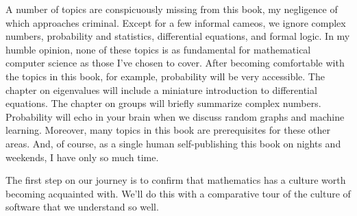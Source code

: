 A number of topics are conspicuously missing from this book, my negligence of
which approaches criminal. Except for a few informal cameos, we ignore complex
numbers, probability and statistics, differential equations, and formal logic.
In my humble opinion, none of these topics is as fundamental for mathematical
computer science as those I've chosen to cover. After becoming comfortable with
the topics in this book, for example, probability will be very accessible. The
chapter on eigenvalues will include a miniature introduction to differential
equations. The chapter on groups will briefly summarize complex numbers.
Probability will echo in your brain when we discuss random graphs and machine
learning. Moreover, many topics in this book are prerequisites for these other
areas.  And, of course, as a single human self-publishing this book on nights
and weekends, I have only so much time.

The first step on our journey is to confirm that mathematics has a culture
worth becoming acquainted with. We'll do this with a comparative tour of the
culture of software that we understand so well.

\mainmatter{}
